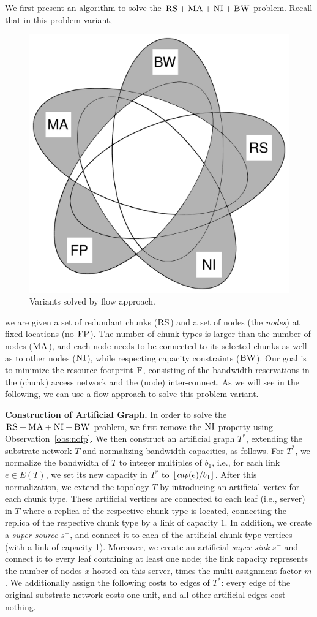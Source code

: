 \documentclass[preprint,12pt]{elsarticle}
\newcommand{\MaFactor}{m}
\newcommand{\Source}{\ensuremath{s^{+}}}
\newcommand{\Sink}{\ensuremath{s^{-}}}
\newcommand{\capacity}{\emph{cap}}
\newcommand{\CC}{\textsc{NI}}
\newcommand{\FP}{\textsc{FP}}
\newcommand{\RS}{\textsc{RS}}
\newcommand{\BW}{\textsc{BW}}
\newcommand{\MA}{\textsc{MA}}
\newcommand{\Cost}{\textsc{F}}
\newcommand{\Tree}{\ensuremath{T}}
\newcommand{\CostTrans}{\ensuremath{b_1}}
\begin{document}
We first present an algorithm to solve the $\RS+\MA+\CC+\BW$ problem.
Recall that in this problem variant,
\begin{figure}
\vspace{-1em}
\includegraphics[width=0.48\columnwidth]{figs/venn_flow.pdf}
\caption{Variants solved by flow approach.}
\vspace{-1em}
\label{fig:venn_flow}
\end{figure}
we are given a set of redundant chunks ($\RS$) and a set of
nodes
(the \emph{nodes})
at fixed locations (no $\FP$). The number of chunk types is larger than the number
of nodes ($\MA$), and each node needs to be connected
to its selected chunks as well as to other nodes ($\CC$), while respecting
capacity constraints ($\BW$).
Our goal is to minimize the resource footprint $\Cost$, consisting
of the bandwidth reservations in the (chunk) access network and the (node)
inter-connect.
As we will see in the following, we can use a flow approach to solve this
problem variant.




\textbf{Construction of Artificial Graph.}
In order to solve the $\RS+\MA+\CC+\BW$ problem,
we first remove the $\CC$ property using Observation~\ref{obs:nofp}.
We then construct
an artificial graph $\Tree^*$, extending the substrate network $\Tree$ and
normalizing bandwidth capacities, as follows. For $\Tree^*$,
we normalize the bandwidth of $\Tree$ to integer multiples of $\CostTrans$,
i.e., for each link $e\in E(\Tree)$, we set its new
capacity in $\Tree^*$ to $\lfloor\capacity(e)/\CostTrans\rfloor$.
After this normalization, we extend the topology $\Tree$ by
introducing an artificial vertex for each chunk type. These artificial
vertices are connected to each leaf (i.e., server) in $\Tree$ where a replica
 of the respective chunk type is located,
connecting the replica of the respective chunk type by a link of capacity $1$. In
addition, we create a
\emph{super-source} $\Source$, and connect it to each of the artificial chunk
type vertices (with a link of capacity 1). Moreover, we create an artificial \emph{super-sink} $\Sink$ and
connect it to every leaf containing at least one node; the link capacity represents
the number of nodes $x$ hosted on this server, times the multi-assignment factor
$\MaFactor$.
We additionally assign the following costs to edges of $\Tree^*$:
every edge of the original substrate network costs one unit, and all other artificial edges
cost nothing.
\end{document}
